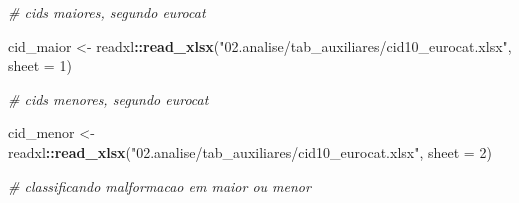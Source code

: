 \documentclass[
]{article}
\newenvironment{Shaded}{\begin{snugshade}}{\end{snugshade}}
\newcommand{\AttributeTok}[1]{\textcolor[rgb]{0.13,0.29,0.53}{#1}}
\newcommand{\CommentTok}[1]{\textcolor[rgb]{0.56,0.35,0.01}{\textit{#1}}}
\newcommand{\DecValTok}[1]{\textcolor[rgb]{0.00,0.00,0.81}{#1}}
\newcommand{\FunctionTok}[1]{\textcolor[rgb]{0.13,0.29,0.53}{\textbf{#1}}}
\newcommand{\NormalTok}[1]{#1}
\newcommand{\OtherTok}[1]{\textcolor[rgb]{0.56,0.35,0.01}{#1}}
\newcommand{\SpecialCharTok}[1]{\textcolor[rgb]{0.81,0.36,0.00}{\textbf{#1}}}
\newcommand{\StringTok}[1]{\textcolor[rgb]{0.31,0.60,0.02}{#1}}
\begin{document}
\begin{Shaded}
\begin{Highlighting}[]
\CommentTok{\# cids maiores, segundo eurocat}

\NormalTok{cid\_maior }\OtherTok{\textless{}{-}}\NormalTok{ readxl}\SpecialCharTok{::}\FunctionTok{read\_xlsx}\NormalTok{(}\StringTok{"02.analise/tab\_auxiliares/cid10\_eurocat.xlsx"}\NormalTok{, }\AttributeTok{sheet =} \DecValTok{1}\NormalTok{)}

\CommentTok{\# cids menores, segundo eurocat}

\NormalTok{cid\_menor }\OtherTok{\textless{}{-}}\NormalTok{ readxl}\SpecialCharTok{::}\FunctionTok{read\_xlsx}\NormalTok{(}\StringTok{"02.analise/tab\_auxiliares/cid10\_eurocat.xlsx"}\NormalTok{, }\AttributeTok{sheet =} \DecValTok{2}\NormalTok{)}

\CommentTok{\# classificando malformacao em maior ou menor}


\end{Highlighting}
\end{Shaded}
\end{document}
